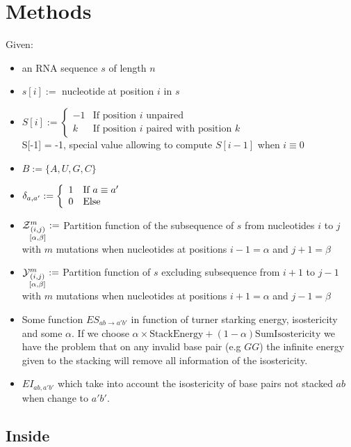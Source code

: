 \section{Methods}
\label{sec:methods}

Given:
\begin{itemize}
	\item an RNA sequence $s$ of length $n$
	\item $s[i]:=$ nucleotide at position $i$ in $s$
	\item $\displaystyle
		S[i]:=\left\{
		\begin{array}{rl}
			-1 & \text{If position }i \text{ unpaired}\\
	 		k  & \text{If position }i \text{ paired with position }k
		\end{array}\right.
		$\\
		S[-1] = -1, special value allowing to compute $S[i-1]$ when $i\equiv 0$
	\item $B:=\{A, U, G, C\}$
	\item $ \delta_{a,a'}:=\left\{
		\begin{array}{ll}
			1 &\text{If }a \equiv a'\\
			0 &\text{Else}
		\end{array}\right.$
	\item $\Z{i,j}{m}{\alpha,\beta}:=$ Partition function of the subsequence of $s$ from nucleotides 
	$i$ to $j$ with $m$ mutations when nucleotides at positions $i-1=\alpha$ and $j+1=\beta$
	\item $\Y{i,j}{m}{\alpha,\beta}:=$ Partition function of $s$ excluding subsequence  from $i+1$ to 
	$j-1$ with $m$ mutations when nucleotides at positions $i+1=\alpha$ and $j-1=\beta$ 	
	\item Some function $ES_{ab \to a'b'}$ in function of turner starking energy, isostericity and
	  	some $\alpha$. If we choose $\alpha\times\text{StackEnergy} + (1-\alpha)\text{SumIsostericity}$ 
		we 	have the problem that on any invalid base pair (e.g $GG$) the infinite energy given to the 
		stacking 	will remove all information of the isostericity. 
	\item $EI_{ab,a'b'}$ which take into account the isostericity of base pairs not stacked $ab$ when 
	change to $a'b'$.
\end{itemize}
	
	
\subsection{Inside}

